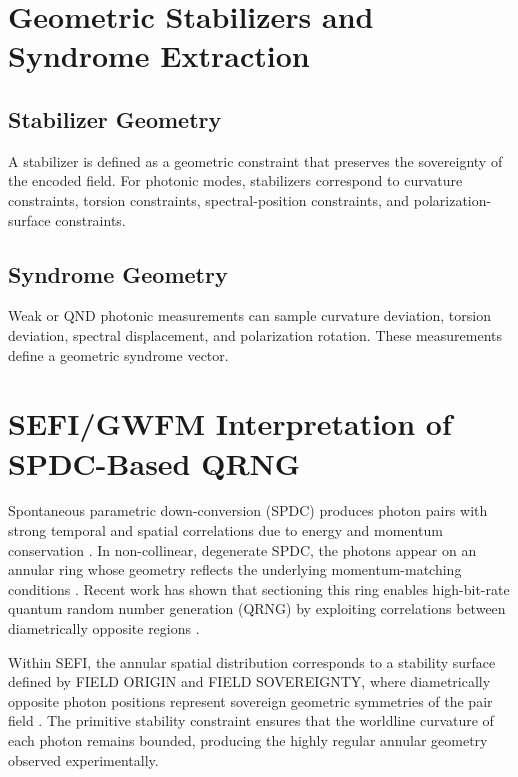 \documentclass[aip, adv, reprint, superscriptaddress]{revtex4-2}
\begin{document}
\section{Geometric Stabilizers and Syndrome Extraction}

\subsection{Stabilizer Geometry}

A stabilizer is defined as a geometric constraint that preserves the sovereignty of the 
encoded field. For photonic modes, stabilizers correspond to curvature constraints, 
torsion constraints, spectral-position constraints, and polarization-surface constraints.

\subsection{Syndrome Geometry}

Weak or QND photonic measurements can sample curvature deviation, torsion deviation, 
spectral displacement, and polarization rotation. These measurements define a 
geometric syndrome vector.

\section{SEFI/GWFM Interpretation of SPDC-Based QRNG}


Spontaneous parametric down-conversion (SPDC) produces photon pairs with strong 
temporal and spatial correlations due to energy and momentum conservation 
\cite{HongMandel, Uren2005}. In non-collinear, degenerate SPDC, the photons appear 
on an annular ring whose geometry reflects the underlying momentum-matching 
conditions \cite{Jabir2017}. Recent work has shown that sectioning this ring enables 
high-bit-rate quantum random number generation (QRNG) by exploiting correlations 
between diametrically opposite regions \cite{SPDCQRNG2023}.

Within SEFI, the annular spatial distribution corresponds to a stability surface defined 
by FIELD ORIGIN and FIELD SOVEREIGNTY, where diametrically opposite photon 
positions represent sovereign geometric symmetries of the pair field \cite{DuttonSEFI}. 
The primitive stability constraint ensures that the worldline curvature of each photon 
remains bounded, producing the highly regular annular geometry observed 
experimentally.
\end{document}
